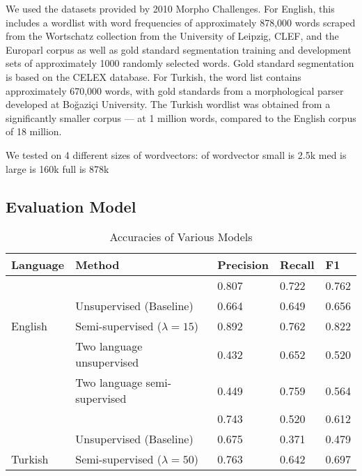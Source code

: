 \documentclass[11pt,twocolumn]{article}
\begin{document}
We used the datasets provided by 2010 Morpho Challenges. For English, this includes
a wordlist with word frequencies of approximately 878,000 words scraped from the
Wortschatz collection from the University of Leipzig, CLEF, and the Europarl corpus
as well as gold standard segmentation training and development sets of approximately 
1000 randomly selected words. Gold standard segmentation is based on the CELEX database.
For Turkish, the word list contains approximately 670,000 words, with gold standards
from a morphological parser developed at Boğaziçi University. The Turkish wordlist
was obtained from a significantly smaller corpus --- at 1 million words, compared
to the English corpus of 18 million.

We tested on 4 different sizes of wordvectors:
of wordvector 
small is 2.5k
med is 
large is 160k
full is 878k

\subsection{Evaluation Model}

\begin{table*}
    \begin{center}
        \begin{tabular}{ | l | l | l | l | l |}
            \hline
            Language & Method & Precision & Recall & F1 \\ \hline
                     & \citeauthor{Narasimhan15} & 0.807 & 0.722 & 0.762 \\ 
                     & Unsupervised (Baseline) & 0.664  & 0.649 & 0.656 \\ 
            English & Semi-supervised ($\lambda=15$) & 0.892 & 0.762 & 0.822 \\ 
                    & Two language unsupervised & 0.432 & 0.652 & 0.520 \\ 
                    & Two language semi-supervised & 0.449 & 0.759 & 0.564 \\ \hline
                    & \citeauthor{Narasimhan15} & 0.743 & 0.520 & 0.612 \\ 
                    & Unsupervised (Baseline) & 0.675 & 0.371 & 0.479 \\ 
            Turkish & Semi-supervised ($\lambda=50$) & 0.763 & 0.642 & 0.697 \\ 
        \end{tabular}
        \caption{Accuracies of Various Models}
    \end{center}
\end{table*}
\end{document}
